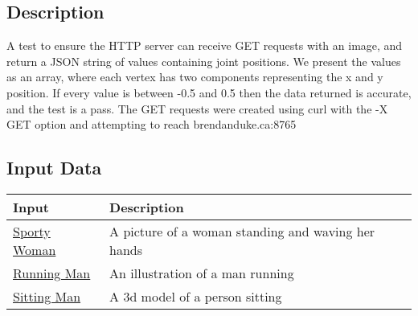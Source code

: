 \documentclass{scrreprt}
\begin{document}
\subsection{Description}

A test to ensure the HTTP server can receive GET requests with an image, and return a JSON string of values containing joint positions. We present the values as an array, where each vertex has two components representing the x and y position. If every value is between -0.5 and 0.5 then the data returned is accurate, and the test is a pass. The GET requests were created using curl with the -X GET option and attempting to reach brendanduke.ca:8765
\subsection{Input Data}

\begin{table}[H]
        \centering
        \begin{tabular}{p{3cm}p{6cm}}
                \hline\hline
                Input & Description\\
                \hline\hline
                \href {http://st2.depositphotos.com/1912333/10089/i/950/depositphotos_100892946-stock-photo-sporty-woman-waving-hands.jpg}{Sporty Woman} &  A picture of a woman standing and waving her hands\\
                \hline
                \href {https://www.drawingnow.com/file/videos/image/how-to-draw-a-running-person.jpg}{Running Man} & An illustration of a man running\\
                \hline
                \href {https://www.formfonts.com/files/1/13470/four-low-poly-models-people-sitting-different-poses_FF_Model_ID13470_1_LPMAD_20_00.jpg}{Sitting Man} & A 3d model of a person sitting\\
                \hline
        \end{tabular}
\end{table}
\end{document}
